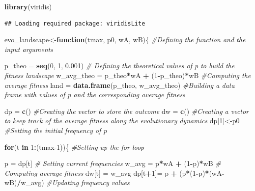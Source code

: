 \documentclass[
]{book}
\newenvironment{Shaded}{\begin{snugshade}}{\end{snugshade}}
\newcommand{\CommentTok}[1]{\textcolor[rgb]{0.56,0.35,0.01}{\textit{#1}}}
\newcommand{\ControlFlowTok}[1]{\textcolor[rgb]{0.13,0.29,0.53}{\textbf{#1}}}
\newcommand{\DecValTok}[1]{\textcolor[rgb]{0.00,0.00,0.81}{#1}}
\newcommand{\FloatTok}[1]{\textcolor[rgb]{0.00,0.00,0.81}{#1}}
\newcommand{\FunctionTok}[1]{\textcolor[rgb]{0.13,0.29,0.53}{\textbf{#1}}}
\newcommand{\NormalTok}[1]{#1}
\newcommand{\OtherTok}[1]{\textcolor[rgb]{0.56,0.35,0.01}{#1}}
\newcommand{\SpecialCharTok}[1]{\textcolor[rgb]{0.81,0.36,0.00}{\textbf{#1}}}
\begin{document}
\begin{Shaded}
\begin{Highlighting}[]
\FunctionTok{library}\NormalTok{(viridis)}
\end{Highlighting}
\end{Shaded}

\begin{verbatim}
## Loading required package: viridisLite
\end{verbatim}

\begin{Shaded}
\begin{Highlighting}[]
\NormalTok{evo\_landscape}\OtherTok{\textless{}{-}}\ControlFlowTok{function}\NormalTok{(tmax, p0, wA, wB)\{ }\CommentTok{\#Defining the function and the input arguments}
  
\NormalTok{p\_theo }\OtherTok{=} \FunctionTok{seq}\NormalTok{(}\DecValTok{0}\NormalTok{, }\DecValTok{1}\NormalTok{, }\FloatTok{0.001}\NormalTok{) }\CommentTok{\# Defining the theoretical values of p to build the fitness landscape}
\NormalTok{w\_avg\_theo }\OtherTok{=}\NormalTok{ p\_theo}\SpecialCharTok{*}\NormalTok{wA }\SpecialCharTok{+}\NormalTok{ (}\DecValTok{1}\SpecialCharTok{{-}}\NormalTok{p\_theo)}\SpecialCharTok{*}\NormalTok{wB }\CommentTok{\#Computing the average fitness}
\NormalTok{land }\OtherTok{=} \FunctionTok{data.frame}\NormalTok{(p\_theo, w\_avg\_theo) }\CommentTok{\#Building a data frame with values of p and the corresponding average fitness}
  
\NormalTok{dp }\OtherTok{=} \FunctionTok{c}\NormalTok{() }\CommentTok{\#Creating the vector to store the outcome}
\NormalTok{dw }\OtherTok{=} \FunctionTok{c}\NormalTok{() }\CommentTok{\#Creating a vector to keep track of the average fitness along the evolutionary dynamics}
\NormalTok{dp[}\DecValTok{1}\NormalTok{]}\OtherTok{\textless{}{-}}\NormalTok{p0 }\CommentTok{\#Setting the initial frequency of p}
  
  \ControlFlowTok{for}\NormalTok{(t }\ControlFlowTok{in} \DecValTok{1}\SpecialCharTok{:}\NormalTok{(tmax}\DecValTok{{-}1}\NormalTok{))\{ }\CommentTok{\#Setting up the for loop}
  
\NormalTok{  p }\OtherTok{=}\NormalTok{ dp[t] }\CommentTok{\# Setting current frequencies}
\NormalTok{  w\_avg }\OtherTok{=}\NormalTok{ p}\SpecialCharTok{*}\NormalTok{wA }\SpecialCharTok{+}\NormalTok{ (}\DecValTok{1}\SpecialCharTok{{-}}\NormalTok{p)}\SpecialCharTok{*}\NormalTok{wB }\CommentTok{\# Computing average fitness}
\NormalTok{  dw[t] }\OtherTok{=}\NormalTok{ w\_avg}
\NormalTok{  dp[t}\SpecialCharTok{+}\DecValTok{1}\NormalTok{]}\OtherTok{=}\NormalTok{ p }\SpecialCharTok{+}\NormalTok{ (p}\SpecialCharTok{*}\NormalTok{(}\DecValTok{1}\SpecialCharTok{{-}}\NormalTok{p)}\SpecialCharTok{*}\NormalTok{(wA}\SpecialCharTok{{-}}\NormalTok{wB)}\SpecialCharTok{/}\NormalTok{w\_avg) }\CommentTok{\#Updating frequency values}
  

\end{Highlighting}
\end{Shaded}
\end{document}
